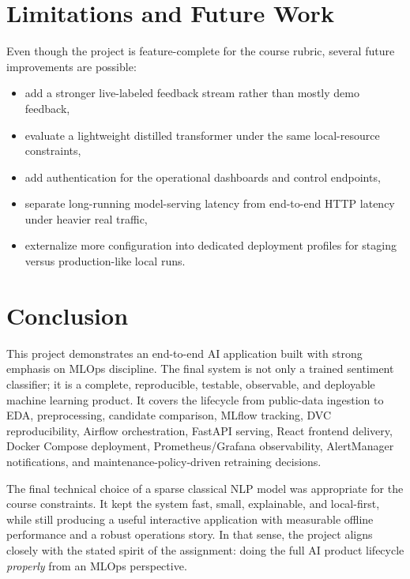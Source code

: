\documentclass[11pt,a4paper]{article}
\begin{document}
\section{Limitations and Future Work}

Even though the project is feature-complete for the course rubric, several future improvements are possible:

\begin{itemize}[leftmargin=1.4em]
  \item add a stronger live-labeled feedback stream rather than mostly demo feedback,
  \item evaluate a lightweight distilled transformer under the same local-resource constraints,
  \item add authentication for the operational dashboards and control endpoints,
  \item separate long-running model-serving latency from end-to-end HTTP latency under heavier real traffic,
  \item externalize more configuration into dedicated deployment profiles for staging versus production-like local runs.
\end{itemize}

\section{Conclusion}

This project demonstrates an end-to-end AI application built with strong emphasis on MLOps discipline. The final system is not only a trained sentiment classifier; it is a complete, reproducible, testable, observable, and deployable machine learning product. It covers the lifecycle from public-data ingestion to EDA, preprocessing, candidate comparison, MLflow tracking, DVC reproducibility, Airflow orchestration, FastAPI serving, React frontend delivery, Docker Compose deployment, Prometheus/Grafana observability, AlertManager notifications, and maintenance-policy-driven retraining decisions.

The final technical choice of a sparse classical NLP model was appropriate for the course constraints. It kept the system fast, small, explainable, and local-first, while still producing a useful interactive application with measurable offline performance and a robust operations story. In that sense, the project aligns closely with the stated spirit of the assignment: doing the full AI product lifecycle \emph{properly} from an MLOps perspective.
\end{document}
